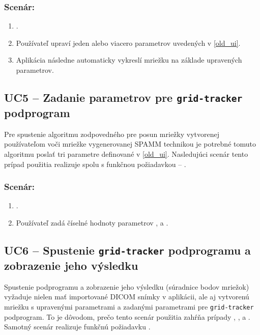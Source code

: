 \subsubsection*{Scenár:}
\begin {enumerate}
\item {.}
\item {Používateľ upraví jeden alebo viacero parametrov uvedených v \ref{old_ui}.}
\item {Aplikácia následne automaticky vykreslí mriežku na základe upravených parametrov.}
\end {enumerate}

\subsection {UC5 -- Zadanie parametrov pre \texttt{grid-tracker} podprogram}\label{uc5}
Pre spustenie algoritmu zodpovedného pre posun mriežky vytvorenej používateľom voči mriežke vygenerovanej SPAMM technikou je potrebné tomuto algoritmu poslať tri parametre definované v \ref{old_ui}. Nasledujúci scenár tento prípad použitia realizuje spolu s funkčnou požiadavkou -- .

\subsubsection*{Scenár:}
\begin {enumerate}
\item {.}
\item {Používateľ zadá číselné hodnoty parametrov , \newline {} a .}
\end {enumerate}

\subsection {UC6 -- Spustenie \texttt{grid-tracker} podprogramu a zobrazenie jeho výsledku}
Spustenie podprogramu a zobrazenie jeho výsledku (súradnice bodov mriežok) vyžaduje nielen mať importované DICOM snímky v aplikácii, ale aj vytvorenú mriežku s upravenými parametrami a zadanými parametrami pre \texttt{grid-tracker} podprogram. To je dôvodom, prečo tento scenár použitia zahŕňa prípady , ,  a . Samotný scenár realizuje funkčnú požiadavku .

